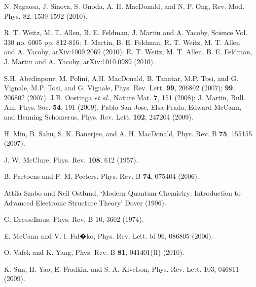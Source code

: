 \documentclass[twocolumn,prb,showpacs,preprintnumbers,amsmath,amssymb]{revtex4}
\begin{document}
\begin{thebibliography}{99}
 N. Nagaosa, J. Sinova, S. Onoda, A. H. MacDonald, and N. P. Ong,     
Rev. Mod. Phys. 82, 1539 1592 (2010).

R. T. Weitz, M. T. Allen, B. E. Feldman, J. Martin and A. Yacoby,
Science  Vol. 330  no. 6005  pp. 812-816;  
J. Martin, B. E. Feldman, R. T. Weitz, M. T. Allen and A. Yacoby,
arXiv:1009.2069 (2010);
R. T. Weitz, M. T. Allen, B. E. Feldman, J. Martin and A. Yacoby,
arXiv:1010.0989 (2010).

  S.H. Abedinpour, M. Polini, A.H. MacDonald, B. Tanatar,
M.P. Tosi, and G. Vignale, M.P. Tosi, and G. Vignale, Phys. Rev. Lett. {\bf 99}, 206802 (2007); 
{\bf 99}, 206802 (2007).
J.B. Oostinga {\em et al.}, Nature Mat. {\bf 7}, 151 (2008); 
J. Martin, Bull. Am. Phys. Soc. {\bf 54}, 191 (2009);
Pablo San-Jose, Elsa Prada, Edward McCann, and Henning Schomerus,
Phys. Rev. Lett. {\bf 102}, 247204 (2009).

H. Min, B. Sahu, S. K. Banerjee, and A. H. MacDonald,
Phys. Rev. B {\bf 75}, 155155 (2007).

J. W. McClure, Phys. Rev. {\bf 108}, 612 (1957).


 B. Partoens and F. M. Peeters,
Phys. Rev. B {\bf 74}, 075404 (2006).

Attila Szabo and Neil Ostlund,
`Modern Quantum Chemistry: Introduction to Advanced Electronic Structure Theory' 
Dover (1996). %

G. Dresselhaus, Phys. Rev. B {10}, 3602 (1974).

E. McCann and V. I. Fal�ko,
Phys. Rev. Lett. {bf 96}, 086805 (2006).


O. Vafek and K. Yang,
Phys. Rev. B {\bf 81}, 041401(R) (2010).

 K. Sun, H. Yao, E. Fradkin, and S. A. Kivelson,
Phys. Rev. Lett. 103, 046811 (2009).


\end{thebibliography}
\end{document}
